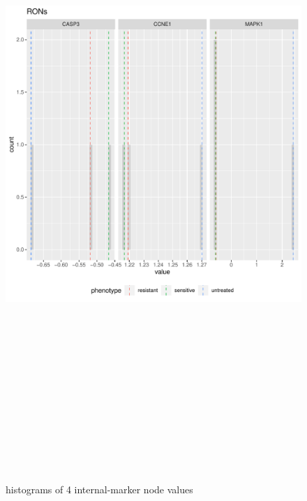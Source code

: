 \documentclass[
]{book}
\begin{document}
\begin{figure}[H]

{\centering \includegraphics[width=460pt,height=700pt]{crc/results/3-marker-nodes/experimental_internalmarkers} 

}

\caption{histograms of 4 internal-marker node values}\label{fig:unnamed-chunk-39}
\end{figure}
\end{document}
